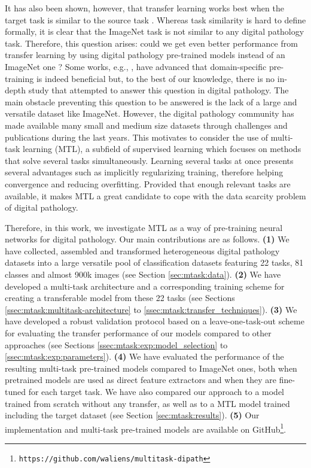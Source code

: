 It has also been shown, however, that transfer learning works best when the target task is similar to the source task \cite{yosinski2014transferable}. Whereas task similarity is hard to define formally, it is clear that the ImageNet task is not similar to any digital pathology task. Therefore, this question arises: could we get even better performance from transfer learning by using digital pathology pre-trained models instead of an ImageNet one ? Some works, e.g., \cite{khan2019improving, medela2019few, kraus2017automated, shang2019and}, have advanced that domain-specific pre-training is indeed beneficial but, to the best of our knowledge, there is no in-depth study that attempted to answer this question in digital pathology. The main obstacle preventing this question to be answered is the lack of a large and versatile dataset like ImageNet. However, the digital pathology community has made available many small and medium size datasets through challenges and publications during the last years. This motivates to consider the use of multi-task learning \cite{zhang2017survey} (MTL), a subfield of supervised learning which focuses on methods that solve several tasks simultaneously. Learning several tasks at once presents several advantages such as implicitly regularizing training, therefore helping convergence and reducing overfitting. Provided that enough relevant tasks are available, it makes MTL a great candidate to cope with the data scarcity problem of digital pathology.

Therefore, in this work, we investigate MTL as a way of pre-training neural networks for digital pathology. Our main contributions are as follows. \textbf{(1)} We have collected, assembled and transformed heterogeneous digital pathology datasets into a large versatile pool of classification datasets featuring 22 tasks, 81 classes and almost 900k images (see Section \ref{sec:mtask:data}). \textbf{(2)} We have developed a multi-task architecture and a corresponding training scheme for creating a transferable model from these 22 tasks (see Sections \ref{ssec:mtask:multitask-architecture} to \ref{ssec:mtask:transfer_techniques}). \textbf{(3)} We have developed a robust validation protocol based on a leave-one-task-out scheme for evaluating the transfer performance of our models compared to other approaches (see Sections \ref{ssec:mtask:exp:model_selection} to \ref{ssec:mtask:exp:parameters}). \textbf{(4)} We have evaluated the performance of the resulting multi-task pre-trained models compared to ImageNet ones, both when pretrained models are used as direct feature extractors and when they are fine-tuned for each target task. We have also compared our approach to a model trained from scratch without any transfer, as well as to a MTL model trained including the target dataset (see Section \ref{sec:mtask:results}). \textbf{(5)} Our implementation and multi-task pre-trained models are available on GitHub\footnote{\texttt{https://github.com/waliens/multitask-dipath}}.

